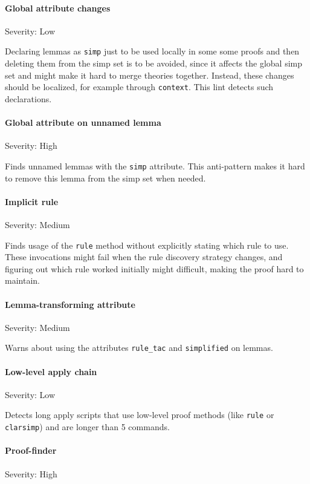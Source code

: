 \paragraph{Global attribute changes}
Severity: Low

Declaring lemmas as \texttt{simp} just to be used locally in some some
proofs and then deleting
them from the simp set is to be avoided, since it affects the global simp set and
might make it hard to merge theories together. Instead, these changes should
be localized, for example through \texttt{context}. This lint detects such 
declarations.

\paragraph{Global attribute on unnamed lemma} \label{lint:globalattr}
Severity: High

Finds unnamed lemmas with the \texttt{simp} attribute. This anti-pattern makes
it hard to remove this lemma from the simp set when needed.

\paragraph{Implicit rule}\label{lint:implicitrule}
Severity: Medium

Finds usage of the \texttt{rule} method without explicitly stating which rule
to use. These invocations might fail when the rule discovery strategy changes, and
figuring out which rule worked initially might difficult, making the proof hard to
maintain.
\paragraph{Lemma-transforming attribute}\label{lint:lemmatrans}
Severity: Medium

Warns about using the attributes \texttt{rule\_tac} and \texttt{simplified} on 
lemmas.

\paragraph{Low-level apply chain}\label{lint:lowlevel}
Severity: Low

Detects long apply scripts that use low-level proof methods (like \texttt{rule} or
\texttt{clarsimp}) and are longer than 5 commands.

\paragraph{Proof-finder}
Severity: High


